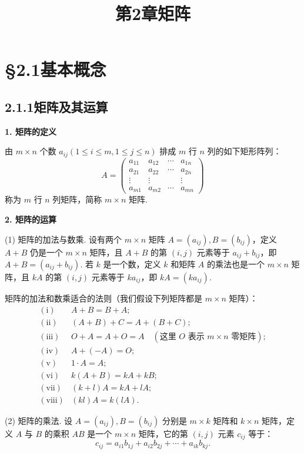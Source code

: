 \documentclass[UTF8, 12pt, fontset=fandol, oneside]{ctexart}
\title{第2章\quad 矩阵}
\author{}
\date{}
\begin{document}
\maketitle

\section*{§2.1\quad 基本概念}

\subsection*{2.1.1\quad 矩阵及其运算}

\noindent\textbf{1. 矩阵的定义}

由 $m\times n$ 个数 $a_{ij}(1\le i\le m,1\le j\le n)$ 排成 $m$ 行 $n$ 列的如下矩形阵列：
\[
A=
\left(
\begin{array}{cccc}
a_{11} & a_{12} & \cdots & a_{1n}\\
a_{21} & a_{22} & \cdots & a_{2n}\\
\vdots & \vdots & & \vdots\\
a_{m1} & a_{m2} & \cdots & a_{mn}
\end{array}
\right)
\]
称为 $m$ 行 $n$ 列矩阵，简称 $m\times n$ 矩阵.

\noindent\textbf{2. 矩阵的运算}

(1) 矩阵的加法与数乘. 设有两个 $m\times n$ 矩阵 $A=(a_{ij}),B=(b_{ij})$，定义 $A+B$ 仍是一个 $m\times n$ 矩阵，且 $A+B$ 的第 $(i,j)$ 元素等于 $a_{ij}+b_{ij}$，即 $A+B=(a_{ij}+b_{ij})$. 若 $k$ 是一个数，定义 $k$ 和矩阵 $A$ 的乘法也是一个 $m\times n$ 矩阵，且 $kA$ 的第 $(i,j)$ 元素等于 $ka_{ij}$，即 $kA=(ka_{ij})$.

矩阵的加法和数乘适合的法则（我们假设下列矩阵都是 $m\times n$ 矩阵）：
\[
\begin{array}{ll}
\mathrm{(i)} & A+B=B+A;\\
\mathrm{(ii)} & (A+B)+C=A+(B+C);\\
\mathrm{(iii)} & O+A=A+O=A\quad(\text{这里 }O\text{ 表示 }m\times n\text{ 零矩阵});\\
\mathrm{(iv)} & A+(-A)=O;\\
\mathrm{(v)} & 1\cdot A=A;\\
\mathrm{(vi)} & k(A+B)=kA+kB;\\
\mathrm{(vii)} & (k+l)A=kA+lA;\\
\mathrm{(viii)} & (kl)A=k(lA).
\end{array}
\]

(2) 矩阵的乘法. 设 $A=(a_{ij}),B=(b_{ij})$ 分别是 $m\times k$ 矩阵和 $k\times n$ 矩阵，定义 $A$ 与 $B$ 的乘积 $AB$ 是一个 $m\times n$ 矩阵，它的第 $(i,j)$ 元素 $c_{ij}$ 等于：
\[
c_{ij}=a_{i1}b_{1j}+a_{i2}b_{2j}+\cdots+a_{ik}b_{kj}.
\]
\end{document}
